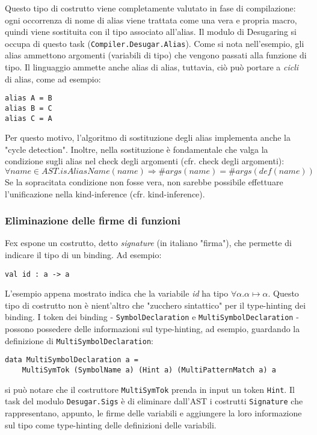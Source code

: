 \documentclass[10pt,a4paper]{article}
\begin{document}
Questo tipo di costrutto viene completamente valutato in fase di compilazione: ogni occorrenza di nome di alias viene
trattata come una vera e propria macro, quindi viene sostituita con il tipo associato all'alias. Il modulo di Desugaring
si occupa di questo task (\texttt{Compiler.Desugar.Alias}).
Come si nota nell'esempio, gli alias ammettono argomenti (variabili di tipo) che vengono passati alla funzione di tipo.
Il linguaggio ammette anche alias di alias, tuttavia, ciò può portare a \textit{cicli} di alias, come ad esempio:

\begin{lstlisting}
alias A = B
alias B = C
alias C = A
\end{lstlisting}

Per questo motivo, l'algoritmo di sostituzione degli alias implementa anche la "cycle detection". Inoltre, nella
sostituzione è fondamentale che valga la condizione sugli alias nel check degli argomenti (cfr. check degli argomenti):
    \[ \forall name \in AST. isAliasName(name) \Longrightarrow \#args(name) = \#args(def(name)) \]
Se la sopracitata condizione non fosse vera, non sarebbe possibile effettuare l'unificazione nella kind-inference (cfr.
kind-inference).

\subsubsection{Eliminazione delle firme di funzioni}
Fex espone un costrutto, detto \textit{signature} (in italiano "firma"), che permette di indicare il tipo di un
binding. Ad esempio:

\begin{lstlisting}
val id : a -> a
\end{lstlisting}

L'esempio appena mostrato indica che la variabile \textit{id} ha tipo $ \forall \alpha. \alpha \mapsto \alpha $. Questo
tipo di costrutto non è nient'altro che "zucchero sintattico" per il type-hinting dei binding. I token dei binding
- \texttt{SymbolDeclaration} e \texttt{MultiSymbolDeclaration} - possono possedere delle informazioni sul type-hinting,
ad esempio, guardando la definizione di \texttt{MultiSymbolDeclaration}:

\begin{lstlisting}
data MultiSymbolDeclaration a =
    MultiSymTok (SymbolName a) (Hint a) (MultiPatternMatch a) a
\end{lstlisting}

si può notare che il costruttore \texttt{MultiSymTok} prenda in input un token \texttt{Hint}. Il task del modulo
\texttt{Desugar.Sigs} è di eliminare dall'AST i costrutti \texttt{Signature} che rappresentano, appunto, le firme delle
variabili e aggiungere la loro informazione sul tipo come type-hinting delle definizioni delle variabili.
\end{document}
